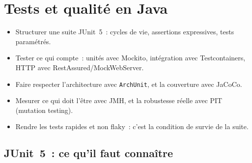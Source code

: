 \documentclass[12pt,a4paper,twoside,openright]{book}
\begin{document}
\chapter{Tests et qualit\'e en Java}
\label{ch-java-tests}

\begin{objectif}
\begin{itemize}
  \item Structurer une suite JUnit~5~: cycles de vie, assertions expressives, tests param\'etr\'es.
  \item Tester ce qui compte~: unit\'es avec Mockito, int\'egration avec Testcontainers, HTTP avec
        RestAssured/MockWebServer.
  \item Faire respecter l'architecture avec \texttt{ArchUnit}, et la couverture avec JaCoCo.
  \item Mesurer ce qui doit l'\^etre avec JMH, et la robustesse r\'eelle avec PIT (mutation testing).
  \item Rendre les tests rapides et non flaky~: c'est la condition de survie de la suite.
\end{itemize}
\end{objectif}

\section{JUnit~5~: ce qu'il faut conna\^itre}
\end{document}
